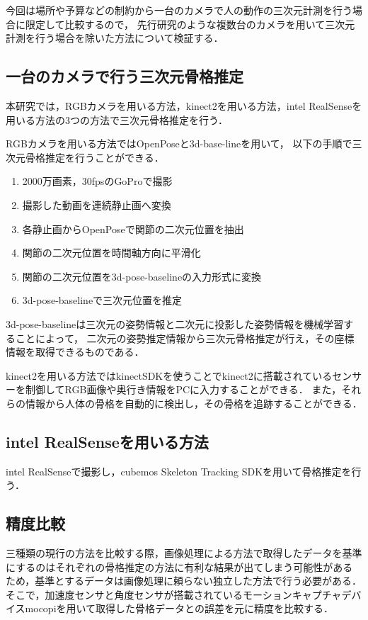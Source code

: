 \documentclass[titlepage]{jarticle}
\begin{document}
今回は場所や予算などの制約から一台のカメラで人の動作の三次元計測を行う場合に限定して比較するので，
先行研究\cite{turugi}のような複数台のカメラを用いて三次元計測を行う場合を除いた方法について検証する．

%
%
\subsection{一台のカメラで行う三次元骨格推定}
%
本研究では，RGBカメラを用いる方法，kinect2を用いる方法，intel RealSenseを用いる方法の3つの方法で三次元骨格推定を行う．

RGBカメラを用いる方法ではOpenPoseと3d-base-lineを用いて，
以下の手順で三次元骨格推定を行うことができる．
\begin{enumerate}
  \item 2000万画素，30fpsのGoProで撮影
  \item 撮影した動画を連続静止画へ変換
  \item 各静止画からOpenPoseで関節の二次元位置を抽出
  \item 関節の二次元位置を時間軸方向に平滑化
  \item 関節の二次元位置を3d-pose-baselineの入力形式に変換
  \item 3d-pose-baselineで三次元位置を推定
\end{enumerate}

3d-pose-baseline\cite{baseline}は三次元の姿勢情報と二次元に投影した姿勢情報を機械学習することによって，
二次元の姿勢推定情報から三次元骨格推定が行え，その座標情報を取得できるものである．

kinect2を用いる方法ではkinectSDKを使うことでkinect2に搭載されているセンサーを制御してRGB画像や奥行き情報をPCに入力することができる．
また，それらの情報から人体の骨格を自動的に検出し，その骨格を追跡することができる．
%
%
\subsection{intel RealSenseを用いる方法}
%
intel RealSenseで撮影し，cubemos Skeleton Tracking SDKを用いて骨格推定を行う．
%
%
\subsection{精度比較}
%
三種類の現行の方法を比較する際，画像処理による方法で取得したデータを基準にするのはそれぞれの骨格推定の方法に有利な結果が出てしまう可能性があるため，基準とするデータは画像処理に頼らない独立した方法で行う必要がある．
そこで，加速度センサと角度センサが搭載されているモーションキャプチャデバイスmocopiを用いて取得した骨格データとの誤差を元に精度を比較する．
\end{document}
